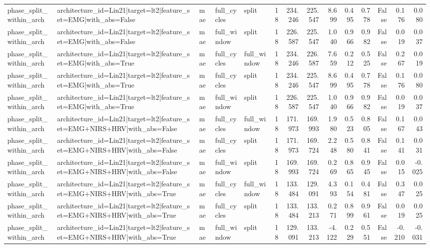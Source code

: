 \begin{table}
\begin{tabular}{lllllrrrrrrrrr}
phase_split_within_arch & architecture_id=Lin21|target=lt2|feature_set=EMG|with_abs=False & mae & full_cycles & split & 18 & 234.246 & 225.547 & 8.699 & 0.495 & 0.778 & False & 0.176 & 0.080 \\
phase_split_within_arch & architecture_id=Lin21|target=lt2|feature_set=EMG|with_abs=False & mae & full_window & split & 18 & 226.587 & 225.547 & 1.040 & 0.966 & 0.982 & False & 0.019 & 0.037 \\
phase_split_within_arch & architecture_id=Lin21|target=lt2|feature_set=EMG|with_abs=True & mae & full_cycles & full_window & 18 & 234.246 & 226.587 & 7.659 & 0.212 & 0.525 & False & 0.267 & 0.019 \\
phase_split_within_arch & architecture_id=Lin21|target=lt2|feature_set=EMG|with_abs=True & mae & full_cycles & split & 18 & 234.246 & 225.547 & 8.699 & 0.495 & 0.778 & False & 0.176 & 0.080 \\
phase_split_within_arch & architecture_id=Lin21|target=lt2|feature_set=EMG|with_abs=True & mae & full_window & split & 18 & 226.587 & 225.547 & 1.040 & 0.966 & 0.982 & False & 0.019 & 0.037 \\
phase_split_within_arch & architecture_id=Lin21|target=lt2|feature_set=EMG+NIRS+HRV|with_abs=False & mae & full_cycles & full_window & 18 & 171.973 & 169.993 & 1.980 & 0.523 & 0.805 & False & 0.167 & 0.043 \\
phase_split_within_arch & architecture_id=Lin21|target=lt2|feature_set=EMG+NIRS+HRV|with_abs=False & mae & full_cycles & split & 18 & 171.973 & 169.724 & 2.248 & 0.580 & 0.841 & False & 0.141 & 0.031 \\
phase_split_within_arch & architecture_id=Lin21|target=lt2|feature_set=EMG+NIRS+HRV|with_abs=False & mae & full_window & split & 18 & 169.993 & 169.724 & 0.269 & 0.865 & 0.945 & False & 0.015 & -0.025 \\
phase_split_within_arch & architecture_id=Lin21|target=lt2|feature_set=EMG+NIRS+HRV|with_abs=True & mae & full_cycles & full_window & 18 & 133.484 & 129.091 & 4.393 & 0.154 & 0.481 & False & 0.347 & 0.025 \\
phase_split_within_arch & architecture_id=Lin21|target=lt2|feature_set=EMG+NIRS+HRV|with_abs=True & mae & full_cycles & split & 18 & 133.484 & 133.213 & 0.271 & 0.899 & 0.961 & False & 0.019 & 0.025 \\
phase_split_within_arch & architecture_id=Lin21|target=lt2|feature_set=EMG+NIRS+HRV|with_abs=True & mae & full_window & split & 18 & 129.091 & 133.213 & -4.122 & 0.229 & 0.551 & False & -0.210 & -0.031 \\

\end{tabular}
\end{table}
